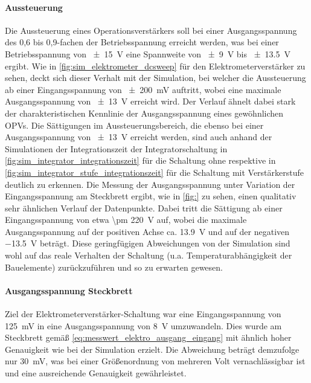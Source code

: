 \documentclass[12pt,english,ngerman]{scrartcl}
\begin{document}
\paragraph{Aussteuerung}
Die Aussteuerung eines Operationsverstärkers soll bei einer Ausgangsspannung
des 0,6 bis 0,9-fachen der Betriebsspannung erreicht werden, was bei einer
Betriebsspannung von \SI{\pm 15}{\volt} eine Spannweite von \SI{\pm 9}{\volt}
bis \SI{\pm 13,5}{\volt} ergibt. Wie in \autoref{fig:sim_elektrometer_dcsweep}
für den Elektrometerverstärker zu sehen, deckt sich dieser Verhalt mit der
Simulation, bei welcher die Aussteuerung ab einer Eingangsspannung von 
\SI{\pm 200}{\milli\volt} auftritt, wobei eine maximale Ausgangsspannung von
\SI{\pm 13}{\volt} erreicht wird. Der Verlauf ähnelt dabei stark der
charakteristischen Kennlinie der Ausgangsspannung eines gewöhnlichen OPVs. Die
Sättigungen im Aussteuerungsbereich, die ebenso bei einer Ausgangsspannung von
\SI{\pm 13}{\volt} erreicht werden, sind auch anhand der Simulationen der
Integrationszeit der Integratorschaltung in
\autoref{fig:sim_integrator_integrationszeit} für die Schaltung ohne respektive
in \autoref{fig:sim_integrator_stufe_integrationszeit} für die Schaltung mit
Verstärkerstufe deutlich zu erkennen. \newline Die Messung der Ausgangsspannung
unter Variation der Eingangsspannung am Steckbrett ergibt, wie in
\autoref{fig:} zu sehen, einen qualitativ sehr ähnlichen Verlauf der
Datenpunkte. 
Dabei tritt die Sättigung ab einer Eingangsspannung von etwa \SI{\pm
220}{\volt} auf, wobei die maximale Ausgangsspannung auf der positiven Achse
ca. \SI{13,9}{\volt} und auf der negativen \SI{-13,5}{\volt} beträgt. Diese
geringfügigen Abweichungen von der Simulation sind wohl auf das reale Verhalten
der Schaltung (u.a. Temperaturabhängigkeit der Bauelemente) zurückzuführen und
so zu erwarten gewesen.

\paragraph{Ausgangsspannung Steckbrett}
Ziel der Elektrometerverstärker-Schaltung war eine Eingangsspannung von
\SI{125}{\milli\volt} in eine Ausgangsspannung von \SI{8}{\volt} umzuwandeln.
Dies wurde am Steckbrett gemäß \autoref{eq:messwert_elektro_ausgang_eingang}
mit ähnlich hoher Genauigkeit wie bei der Simulation erzielt. Die Abweichung
beträgt demzufolge nur \SI{30}{\milli\volt}, was bei einer Größenordnung von
mehreren Volt vernachlässigbar ist und eine ausreichende Genauigkeit
gewährleistet.
\end{document}
